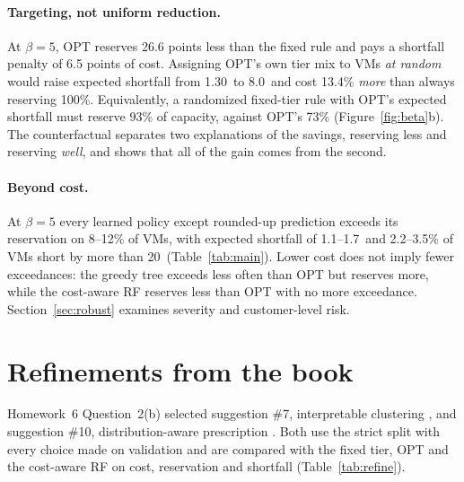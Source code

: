 \documentclass[10pt]{article}
\newcommand{\pp}{\,\text{pp}}
\begin{document}
\paragraph{Targeting, not uniform reduction.} At $\beta=5$, OPT reserves 26.6 points less than the fixed rule and pays a shortfall penalty of 6.5 points of cost. Assigning OPT's own tier mix to VMs \emph{at random} would raise expected shortfall from 1.30\pp{} to 8.0\pp{} and cost 13.4\% \emph{more} than always reserving 100\%. Equivalently, a randomized fixed-tier rule with OPT's expected shortfall must reserve 93\% of capacity, against OPT's 73\% (Figure~\ref{fig:beta}b). The counterfactual separates two explanations of the savings, reserving less and reserving \emph{well}, and shows that all of the gain comes from the second.

\paragraph{Beyond cost.} At $\beta=5$ every learned policy except rounded-up prediction exceeds its reservation on 8--12\% of VMs, with expected shortfall of 1.1--1.7\pp{} and 2.2--3.5\% of VMs short by more than 20\pp{} (Table~\ref{tab:main}). Lower cost does not imply fewer exceedances: the greedy tree exceeds less often than OPT but reserves more, while the cost-aware RF reserves less than OPT with no more exceedance. Section~\ref{sec:robust} examines severity and customer-level risk.

\section{Refinements from the book}
\label{sec:refine}

Homework~6 Question~2(b) selected suggestion \#7, interpretable clustering \citep[Ch.~20, \S\S20.1--20.2]{bertsimas2019mlopt}, and suggestion \#10, distribution-aware prescription \citep[Ch.~13, \S\S13.1--13.2]{bertsimas2019mlopt}. Both use the strict split with every choice made on validation and are compared with the fixed tier, OPT and the cost-aware RF on cost, reservation and shortfall (Table~\ref{tab:refine}).
\end{document}
